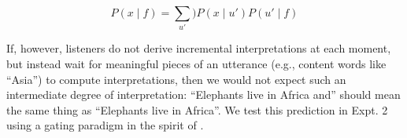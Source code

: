 \documentclass[10pt,letterpaper]{article}
\begin{document}
\begin{equation}
P(x \mid f) = \sum_{u'}) P(x \mid u') P(u' \mid f) 
\label{eq:L0a}
\end{equation}

If, however, listeners do not derive incremental interpretations at each moment, but instead wait for meaningful pieces of an utterance (e.g., content words like ``Asia'') to compute interpretations, then we would not expect such an intermediate degree of interpretation: ``Elephants live in Africa and'' should mean the same thing as ``Elephants live in Africa''. 
We test this prediction in Expt. 2 using a gating paradigm in the spirit of .


\end{document}
